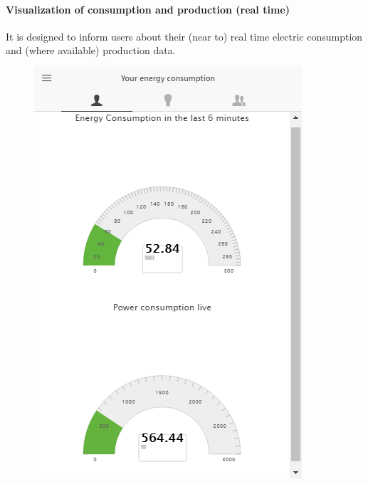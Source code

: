 \paragraph{Visualization of consumption and production (real time)} 
It is designed to inform users about their (near to) real time electric consumption and (where available) production data.
\begin{figure}
      \begin{center}
        \begin{minipage}[htb]{0.45\linewidth}    
         \includegraphics[width=1\linewidth]{img/visual_consumption.png}  
        \end{minipage}
 	\hfill 
        \begin{minipage}[htb]{0.45\linewidth}    

\end{minipage}
\end{center}
\end{figure}
